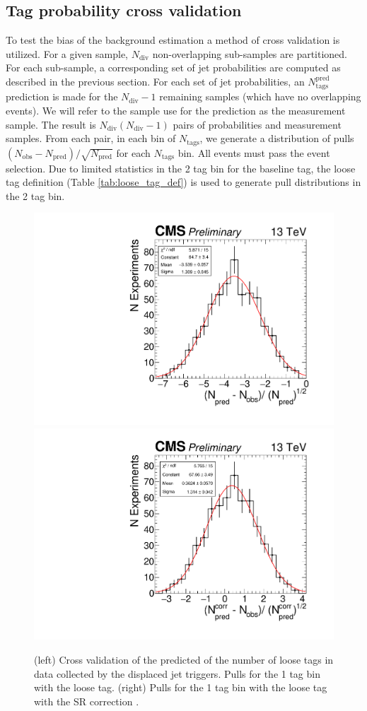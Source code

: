 \subsection{Tag probability cross validation}
\label{sec:xval}

To test the bias of the background estimation a method of cross validation is utilized. For a given sample, $N_{\textrm{div}}$ non-overlapping  sub-samples are partitioned. 
For each sub-sample, a corresponding set of jet probabilities are computed as described in the previous section. 
For each set of jet probabilities, an $N_{\textrm{tags}}^{\textrm{pred}}$  prediction is made for the $N_{\textrm{div}}-1$ remaining samples (which have no overlapping events). We will
refer to the sample use for the prediction as the measurement sample. The result is $N_{\textrm{div}}(N_{\textrm{div}}-1)$ pairs of probabilities and measurement samples. 
From each pair, in each bin of $N_{\textrm{tags}}$, we  generate a distribution of pulls $(N_{\textrm{obs}} - N_{\textrm{pred}}) / \sqrt{N_{\textrm{pred}}}$ for each $N_{\textrm{tags}}$ bin. All events must pass the event selection. Due to limited statistics in the 2 tag bin for the baseline tag, the loose tag definition (Table \ref{tab:loose_tag_def}) is used to generate pull distributions in the 2 tag bin. 

\begin{figure}
\begin{center}
\includegraphics[width=.45\textwidth]{figures/an/ANALYSIS/pulls/data_loose_uncorrected_1tag.pdf}
\includegraphics[width=.45\textwidth]{figures/an/ANALYSIS/pulls/data_loose_corrected_1tag.pdf}
\caption{(left) Cross validation of the predicted of the number of loose tags in data collected by the displaced jet triggers. Pulls for the 1 tag bin with the loose tag. (right) Pulls for the 1 tag bin with the loose tag with the SR correction .   \label{fig:djetpd_1tag_xval}}
\end{center}
\end{figure}

